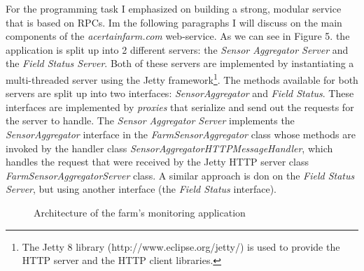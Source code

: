 \documentclass{article}      %
\begin{document}
For the programming task I emphasized on building a strong, modular service that is based on RPCs. Im the following paragraphs I will discuss on the main components of the \emph{acertainfarm.com} web-service. As we can see in Figure 5. the application is split up into 2 different servers: the \emph{Sensor Aggregator Server} and the \emph{Field Status Server}. Both of these servers are implemented by instantiating a multi-threaded server using the Jetty framework\footnote{The Jetty 8 library (http://www.eclipse.org/jetty/) is used to provide the HTTP server and the HTTP client libraries.}.  The methods available for both servers are split up into two interfaces: \emph{SensorAggregator} and \emph{Field Status}. These interfaces are implemented by \emph{proxies} that serialize and send out the requests for the server to handle. The \emph{Sensor Aggregator Server} implements the \emph{SensorAggregator} interface in the \emph{FarmSensorAggregator} class whose methods are invoked by the handler class \emph{SensorAggregatorHTTPMessageHandler}, which handles the request that were received by the Jetty HTTP server class \emph{FarmSensorAggregatorServer} class. A similar approach is don on the \emph{Field Status Server}, but using another interface (the \emph{Field Status} interface). \\

\begin{figure}[ht]
\centering

{%
\setlength{\fboxsep}{5pt}%
%
}%
\caption{Architecture of the farm's monitoring application \label{overflow}}
\end{figure}
\end{document}
